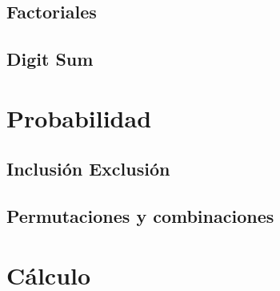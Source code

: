 \documentclass[12pt, fleqn]{report}                             %
\theoremstyle{break}                                            %
\begin{document}
        \section{Factoriales}

        \section{Digit Sum}



    \clearpage
    \chapter{Probabilidad}

        \section{Inclusión Exclusión}

        \section{Permutaciones y combinaciones}

  
    \clearpage
    \chapter{Cálculo}
\end{document}
